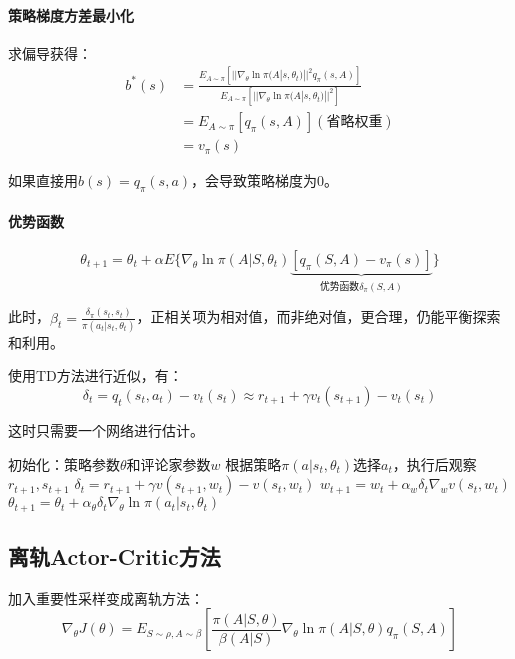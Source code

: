 \documentclass[
12pt, %
a4paper, 
oneside, %
headinclude,footinclude, %
]{scrartcl}
\begin{document}
\paragraph{策略梯度方差最小化}
求偏导获得：
\begin{align*}
b^*(s) &= \frac{E_{A\sim\pi}[||\nabla_\theta\ln\pi(A|s,\theta_t)||^2 q_\pi(s,A)]}{E_{A\sim\pi}[||\nabla_\theta\ln\pi(A|s,\theta_t)||^2]} \\
&= E_{A\sim\pi}[q_\pi(s,A)] (\text{省略权重}) \\
&= v_{\pi}(s)
\end{align*}

如果直接用$ b(s) = q_{\pi}(s, a) $，会导致策略梯度为$ 0 $。
\paragraph{优势函数}
$$ \theta_{t + 1} = \theta_t + \alpha E\{\nabla_\theta \ln \pi(A|S, \theta_t) \underbrace{[q_\pi(S, A) - v_{\pi}(s)]}_{\text{优势函数}\delta_{\pi}(S, A)}\} $$

此时，$ \beta_t = \frac{\delta_{\pi}(s_t, s_t)}{\pi(a_t|s_t, \theta_t)} $，正相关项为相对值，而非绝对值，更合理，仍能平衡探索和利用。

使用TD方法进行近似，有：
$$ \delta_t = q_t(s_t, a_t) - v_t(s_t) \approx r_{t + 1} + \gamma v_t(s_{t + 1}) - v_t(s_t) $$

这时只需要一个网络进行估计。
\begin{myalgorithm}[A2C]
\State 初始化：策略参数$ \theta $和评论家参数$ w $
\State 根据策略$ \pi(a|s_t, \theta_t) $选择$ a_t $，执行后观察$ r_{t + 1}, s_{t + 1} $
\State $ \delta_t = r_{t + 1} + \gamma v(s_{t + 1}, w_t) - v(s_t, w_t) $ 
\State $ w_{t + 1} = w_t + \alpha_w \delta_t \nabla_w v(s_t, w_t) $ 
\State $ \theta_{t + 1} = \theta_t + \alpha_\theta \delta_t \nabla_\theta \ln \pi(a_t|s_t, \theta_t) $ 
\EndFor
\EndFor
\end{myalgorithm}
\subsection[离轨Actor-Critic方法]{离轨Actor-Critic方法}
加入重要性采样变成离轨方法：
$$ \nabla_\theta J(\theta) = E_{S \sim \rho, A \sim \beta}[\frac{\pi(A|S,\theta)}{\beta(A|S)}\nabla_\theta\ln\pi(A|S,\theta)q_\pi(S,A)] $$
\end{document}
